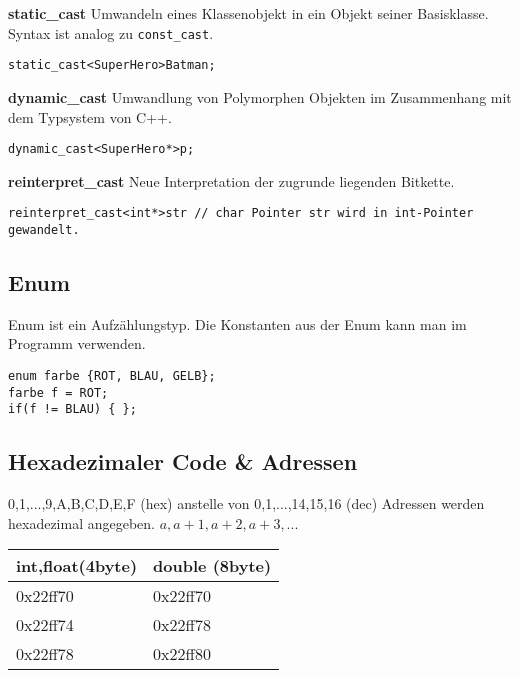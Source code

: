 \textbf{static\_cast}
Umwandeln eines Klassenobjekt in ein Objekt seiner Basisklasse. Syntax ist analog zu \texttt{const\_cast}.
\begin{lstlisting}	
static_cast<SuperHero>Batman;
\end{lstlisting}


\textbf{dynamic\_cast}
Umwandlung von Polymorphen Objekten im Zusammenhang mit dem Typsystem von C++.
\begin{lstlisting}	
dynamic_cast<SuperHero*>p;
\end{lstlisting}


\textbf{reinterpret\_cast}
Neue Interpretation der zugrunde liegenden Bitkette.
\begin{lstlisting}	
reinterpret_cast<int*>str // char Pointer str wird in int-Pointer gewandelt.
\end{lstlisting}


\subsection{Enum}
Enum ist ein Aufzählungstyp. Die Konstanten aus der Enum
kann man im Programm verwenden.
\begin{lstlisting}	
enum farbe {ROT, BLAU, GELB};
farbe f = ROT;
if(f != BLAU) { }; 
\end{lstlisting}

\subsection{Hexadezimaler Code \& Adressen}
0,1,...,9,A,B,C,D,E,F (hex) anstelle von 0,1,...,14,15,16 (dec)
Adressen werden hexadezimal angegeben. $a,a+1,a+2,a+3,...$

\begin{center}
	\begin{tabular}{ ll } 
		\hline
int,float(4byte) & double (8byte)\\
\hline
0x22ff70 & 0x22ff70\\
0x22ff74 & 0x22ff78\\
0x22ff78 & 0x22ff80\\
		\hline
	\end{tabular}
\end{center}

